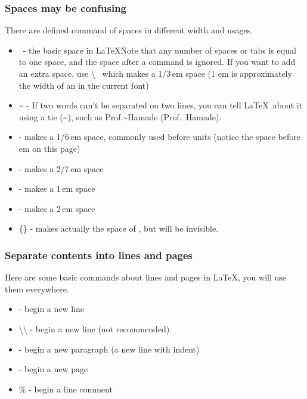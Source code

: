 \begin{frame}
    \frametitle{Spaces may be confusing}
    There are defined command of spaces in different width and usages.
    \begin{itemize}[<+->]
        \item \textvisiblespace\ - the basic space in \LaTeX\. Note that any number of spaces or tabs is equal to one space, and the space after a command is ignored. If you want to add an extra space, use \alert{\textbackslash\textvisiblespace\ } which makes a 1/3\,em space (1 em is approximately the width of an  in the current font)
        \item \~{} - If two words can't be separated on two lines, you can tell \LaTeX\ about it using a tie (\~{}), such as Prof.\~{}Hamade (Prof.~Hamade).
        \item  \samplecommand{,} - makes a 1/6\,em space, commonly used before units (notice the space before em on this page)
        \item  \samplecommand{;} - makes a 2/7\,em space
        \item  {} - makes a 1\,em space
        \item  {} - makes a 2\,em space
        \item  {}\{\} - makes actually the space of , but  will be invisible.
    \end{itemize}
\end{frame}

\begin{frame}
    \frametitle{Separate contents into lines and pages}
    Here are some basic commands about lines and pages in \LaTeX,  you will use them everywhere.
    \pause
    \begin{itemize}[<+->]
        \item {} - begin a new line
        \item \alert{\textbackslash\textbackslash} - begin a new line (not recommended\footnotemark[1])
        \item {} - begin a new paragraph (a new line with indent)
        \item {} - begin a new page
        \item \alert{\%} - begin a line comment
    \end{itemize}
\end{frame}

